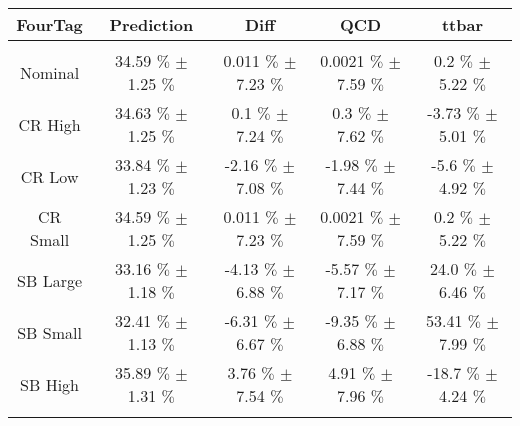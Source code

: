 \begin{footnotesize} 
\begin{tabular}{c|c|c|c|c} 
 FourTag & Prediction & Diff & QCD & ttbar \\ 
\hline\hline 
& & & & \\ 
Nominal & 34.59 $\%$  $\pm$ 1.25 $\%$  & 0.011 $\%$  $\pm$ 7.23 $\%$  & 0.0021 $\%$  $\pm$ 7.59 $\%$  & 0.2 $\%$  $\pm$ 5.22 $\%$ \\ 
CR High & 34.63 $\%$  $\pm$ 1.25 $\%$  & 0.1 $\%$  $\pm$ 7.24 $\%$  & 0.3 $\%$  $\pm$ 7.62 $\%$  & -3.73 $\%$  $\pm$ 5.01 $\%$ \\ 
CR Low & 33.84 $\%$  $\pm$ 1.23 $\%$  & -2.16 $\%$  $\pm$ 7.08 $\%$  & -1.98 $\%$  $\pm$ 7.44 $\%$  & -5.6 $\%$  $\pm$ 4.92 $\%$ \\ 
CR Small & 34.59 $\%$  $\pm$ 1.25 $\%$  & 0.011 $\%$  $\pm$ 7.23 $\%$  & 0.0021 $\%$  $\pm$ 7.59 $\%$  & 0.2 $\%$  $\pm$ 5.22 $\%$ \\ 
SB Large & 33.16 $\%$  $\pm$ 1.18 $\%$  & -4.13 $\%$  $\pm$ 6.88 $\%$  & -5.57 $\%$  $\pm$ 7.17 $\%$  & 24.0 $\%$  $\pm$ 6.46 $\%$ \\ 
SB Small & 32.41 $\%$  $\pm$ 1.13 $\%$  & -6.31 $\%$  $\pm$ 6.67 $\%$  & -9.35 $\%$  $\pm$ 6.88 $\%$  & 53.41 $\%$  $\pm$ 7.99 $\%$ \\ 
SB High & 35.89 $\%$  $\pm$ 1.31 $\%$  & 3.76 $\%$  $\pm$ 7.54 $\%$  & 4.91 $\%$  $\pm$ 7.96 $\%$  & -18.7 $\%$  $\pm$ 4.24 $\%$ \\ 
& & & & \\ 
\hline\hline 
\end{tabular} 
\end{footnotesize} 
\newline 
